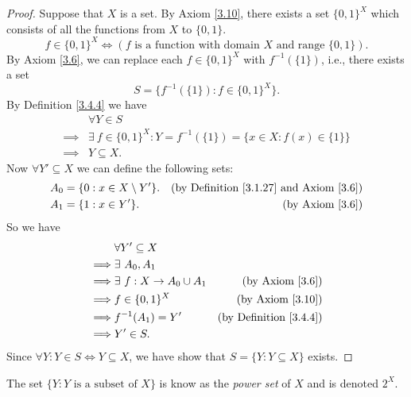 \begin{proof}
    Suppose that \(X\) is a set.
    By Axiom \ref{3.10}, there exists a set \(\{0, 1\}^X\) which consists of all the functions from \(X\) to \(\{0, 1\}\).
    \[
        f \in \{0, 1\}^X \iff (f \text{ is a function with domain } X \text{ and range } \{0, 1\}).
    \]
    By Axiom \ref{3.6}, we can replace each \(f \in \{0, 1\}^X\) with \(f^{-1}(\{1\})\), i.e., there exists a set
    \[
        S = \{f^{-1}(\{1\}) : f \in \{0, 1\}^X\}.
    \]
    By Definition \ref{3.4.4} we have
    \begin{align*}
                 & \forall Y \in S                                                              \\
        \implies & \exists\ f \in \{0, 1\}^X : Y = f^{-1}(\{1\}) = \{x \in X : f(x) \in \{1\}\} \\
        \implies & Y \subseteq X.
    \end{align*}
    Now \(\forall Y' \subseteq X\) we can define the following sets:
    \begin{align*}
        A_0 & = \{0 : x \in X \setminus Y'\}. & \text{(by Definition \ref{3.1.27} and Axiom \ref{3.6})} \\
        A_1 & = \{1 : x \in Y'\}.             & \text{(by Axiom \ref{3.6})}
    \end{align*}
    So we have
    \begin{align*}
                 & \forall Y' \subseteq X                                               \\
        \implies & \exists\ A_0, A_1                                                    \\
        \implies & \exists\ f : X \to A_0 \cup A_1 & \text{(by Axiom \ref{3.6})}        \\
        \implies & f \in \{0, 1\}^X                & \text{(by Axiom \ref{3.10})}       \\
        \implies & f^{-1}(A_1) = Y'                & \text{(by Definition \ref{3.4.4})} \\
        \implies & Y' \in S.
    \end{align*}
    Since \(\forall Y : Y \in S \iff Y \subseteq X\), we have show that \(S = \{Y : Y \subseteq X\}\) exists.
\end{proof}

\begin{remark}\label{3.4.10}
    The set \(\{Y : Y \text{ is a subset of } X\}\) is know as the \emph{power set} of \(X\) and is denoted \(2^X\).
\end{remark}

